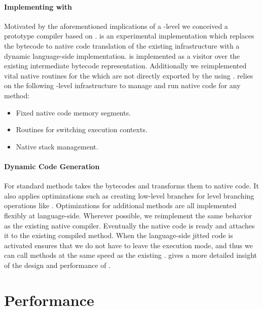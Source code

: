 \paragraph{Implementing \NBJ with \B}
Motivated by the aforementioned implications of a \VM-level \JIT we conceived \NBJ a prototype \JIT compiler based on \B.
\NBJ is an experimental \JIT implementation which replaces the bytecode to native code translation of the existing \JIT infrastructure with a dynamic language-side implementation.
\NBJ is implemented as a visitor over the existing intermediate bytecode representation. 
Additionally we reimplemented  vital native routines for the \JIT which are not directly exported by the \VM using \B. 
\NBJ relies on the following \VM-level infrastructure to manage and run native code for any \PH method:

\begin{itemize}[noitemsep]
	\item Fixed native code memory segments.
	\item Routines for switching execution contexts.
	\item Native stack management.
\end{itemize}

\paragraph{Dynamic Code Generation}
For standard methods \Nabujito takes the bytecodes and transforms them to native code.
It also applies optimizations such as creating low-level branches for \PH level branching operations like .
Optimizations for additional methods are all implemented flexibly at language-side.
Wherever possible, we reimplement the same behavior as the existing native \JIT compiler.
Eventually the native code is ready and \B attaches it to the existing compiled method.
When the language-side jitted code is activated \B ensures that we do not have to leave the \JIT execution mode, and thus we can call methods at the same speed as the existing \JIT.
 gives a more detailed insight of the design and performance of \NBJ.



\section{Performance}

